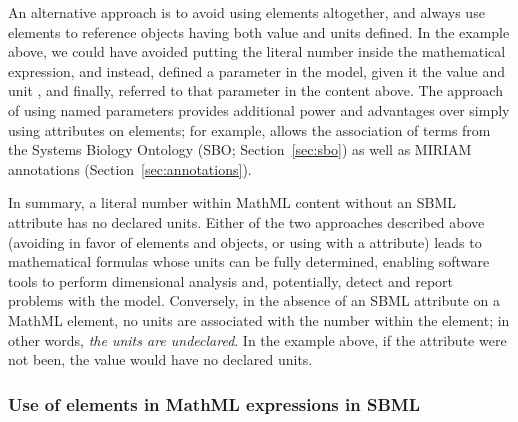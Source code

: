 An alternative approach is to avoid using  elements
altogether, and always use  elements to reference
\Parameter objects having both value and units defined.  In the
example above, we could have avoided putting the literal number
 inside the mathematical expression, and instead, defined
a parameter in the model, given it the value  and unit
, and finally, referred to that parameter in the
 content above.  The approach of using named
parameters provides additional power and advantages over simply
using  attributes on  elements; for
example, \Parameter allows the association of terms from the
Systems Biology Ontology (SBO; Section~\ref{sec:sbo}) as well as
MIRIAM annotations (Section~\ref{sec:annotations}).

In summary, a literal number within MathML content without an SBML
 attribute has no declared units.  Either of the two
approaches described above (\ie avoiding  in favor of
 elements and \Parameter objects, or using 
with a  attribute) leads to mathematical
formulas whose units can be fully determined, enabling software
tools to perform dimensional analysis and, potentially, detect and
report problems with the model.  Conversely, in the absence of an
SBML  attribute on a MathML  element, no
units are associated with the number within the 
element; in other words, \emph{the units are undeclared}.  In the
example above, if the attribute  were not been,
the value  would have no declared units.


\subsubsection{Use of  elements in MathML expressions in SBML}
\label{sec:ci-token}

